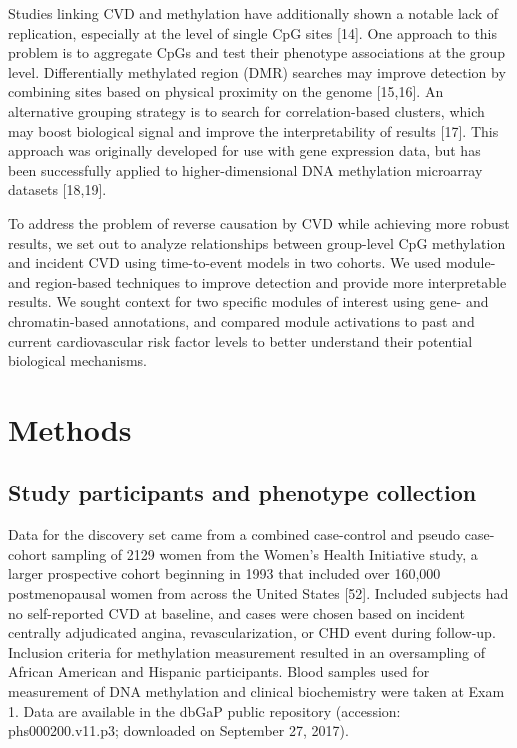 \documentclass[]{bmcart}
\begin{document}
Studies linking CVD and methylation have additionally shown a notable
lack of replication, especially at the level of single CpG sites
{[}14{]}. One approach to this problem is to aggregate CpGs and test
their phenotype associations at the group level. Differentially
methylated region (DMR) searches may improve detection by combining
sites based on physical proximity on the genome {[}15,16{]}. An
alternative grouping strategy is to search for correlation-based
clusters, which may boost biological signal and improve the
interpretability of results {[}17{]}. This approach was originally
developed for use with gene expression data, but has been successfully
applied to higher-dimensional DNA methylation microarray datasets
{[}18,19{]}.

To address the problem of reverse causation by CVD while achieving more
robust results, we set out to analyze relationships between group-level
CpG methylation and incident CVD using time-to-event models in two
cohorts. We used module- and region-based techniques to improve
detection and provide more interpretable results. We sought context for
two specific modules of interest using gene- and chromatin-based
annotations, and compared module activations to past and current
cardiovascular risk factor levels to better understand their potential
biological mechanisms.

\section{Methods}\label{methods}

\subsection{Study participants and phenotype
collection}\label{study-participants-and-phenotype-collection}

Data for the discovery set came from a combined case-control and pseudo
case-cohort sampling of 2129 women from the Women's Health Initiative
study, a larger prospective cohort beginning in 1993 that included over
160,000 postmenopausal women from across the United States {[}52{]}.
Included subjects had no self-reported CVD at baseline, and cases were
chosen based on incident centrally adjudicated angina,
revascularization, or CHD event during follow-up. Inclusion criteria for
methylation measurement resulted in an oversampling of African American
and Hispanic participants. Blood samples used for measurement of DNA
methylation and clinical biochemistry were taken at Exam 1. Data are
available in the dbGaP public repository (accession: phs000200.v11.p3;
downloaded on September 27, 2017).
\end{document}
